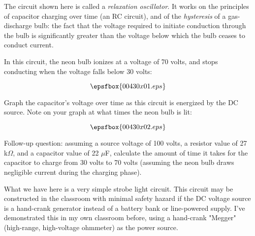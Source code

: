 

The circuit shown here is called a {\it relaxation oscillator}.  It works on the principles of capacitor charging over time (an RC circuit), and of the {\it hysteresis} of a gas-discharge bulb: the fact that the voltage required to initiate conduction through the bulb is significantly greater than the voltage below which the bulb ceases to conduct current.

In this circuit, the neon bulb ionizes at a voltage of 70 volts, and stops conducting when the voltage falls below 30 volts:

$$\epsfbox{00430x01.eps}$$

Graph the capacitor's voltage over time as this circuit is energized by the DC source.  Note on your graph at what times the neon bulb is lit:







$$\epsfbox{00430x02.eps}$$

\vskip 10pt

Follow-up question: assuming a source voltage of 100 volts, a resistor value of 27 k$\Omega$, and a capacitor value of 22 $\mu$F, calculate the amount of time it takes for the capacitor to charge from 30 volts to 70 volts (assuming the neon bulb draws negligible current during the charging phase).







What we have here is a very simple strobe light circuit.  This circuit may be constructed in the classroom with minimal safety hazard if the DC voltage source is a hand-crank generator instead of a battery bank or line-powered supply.  I've demonstrated this in my own classroom before, using a hand-crank "Megger" (high-range, high-voltage ohmmeter) as the power source.




